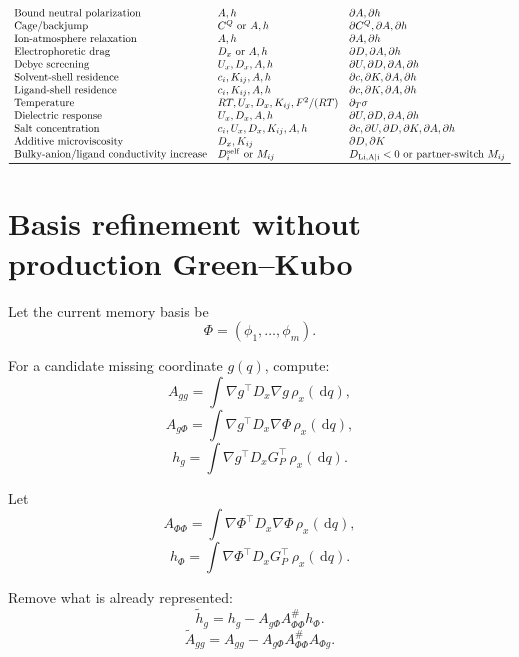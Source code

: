 \documentclass[11pt]{article}
\newcommand{\dd}{\,\mathrm d}
\begin{document}
\[\begin{array}{lll}
\text{Bound neutral polarization} & A,h & \partial A,\partial h\\
\text{Cage/backjump} & C^Q \text{ or } A,h & \partial C^Q,\partial A,\partial h\\
\text{Ion-atmosphere relaxation} & A,h & \partial A,\partial h\\
\text{Electrophoretic drag} & D_x \text{ or } A,h & \partial D,\partial A,\partial h\\
\text{Debye screening} & U_x,D_x,A,h & \partial U,\partial D,\partial A,\partial h\\
\text{Solvent-shell residence} & c_i,K_{ij},A,h & \partial c,\partial K,\partial A,\partial h\\
\text{Ligand-shell residence} & c_i,K_{ij},A,h & \partial c,\partial K,\partial A,\partial h\\
\text{Temperature} & RT,U_x,D_x,K_{ij},F^2/(RT) & \partial_T\sigma\\
\text{Dielectric response} & U_x,D_x,A,h & \partial U,\partial D,\partial A,\partial h\\
\text{Salt concentration} & c_i,U_x,D_x,K_{ij},A,h & \partial c,\partial U,\partial D,\partial K,\partial A,\partial h\\
\text{Additive microviscosity} & D_x,K_{ij} & \partial D,\partial K\\
\text{Bulky-anion/ligand conductivity increase} & D_i^{\rm self}\text{ or }M_{ij} &
D_{\rm Li,A|i}<0\text{ or partner-switch }M_{ij}\\
\bottomrule
\end{array}
\]

\section{Basis refinement without production Green--Kubo}

Let the current memory basis be
\[
\Phi=(\phi_1,\ldots,\phi_m).
\]

For a candidate missing coordinate \(g(q)\), compute:
\[
A_{gg}
=
\int
\nabla g^\top D_x\nabla g\,\rho_x(\dd q),
\]
\[
A_{g\Phi}
=
\int
\nabla g^\top D_x\nabla\Phi\,\rho_x(\dd q),
\]
\[
h_g
=
\int
\nabla g^\top D_xG_P^\top\,\rho_x(\dd q).
\]

Let
\[
A_{\Phi\Phi}
=
\int
\nabla\Phi^\top D_x\nabla\Phi\,\rho_x(\dd q),
\]
\[
h_\Phi
=
\int
\nabla\Phi^\top D_xG_P^\top\,\rho_x(\dd q).
\]

Remove what is already represented:
\[
\tilde h_g
=
h_g-A_{g\Phi}A_{\Phi\Phi}^\#h_\Phi.
\]
\[
\tilde A_{gg}
=
A_{gg}-A_{g\Phi}A_{\Phi\Phi}^\#A_{\Phi g}.
\]
\end{document}
